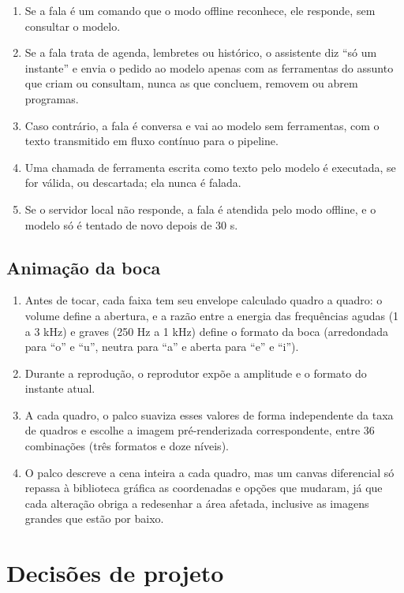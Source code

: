 \begin{enumerate}[label=\arabic*.]
  \item Se a fala é um comando que o modo offline reconhece, ele responde, sem consultar o modelo.
  \item Se a fala trata de agenda, lembretes ou histórico, o assistente diz “só um instante” e envia o
        pedido ao modelo apenas com as ferramentas do assunto que criam ou consultam, nunca as que
        concluem, removem ou abrem programas.
  \item Caso contrário, a fala é conversa e vai ao modelo sem ferramentas, com o texto transmitido em
        fluxo contínuo para o pipeline.
  \item Uma chamada de ferramenta escrita como texto pelo modelo é executada, se for válida, ou
        descartada; ela nunca é falada.
  \item Se o servidor local não responde, a fala é atendida pelo modo offline, e o modelo só é tentado
        de novo depois de 30 s.
\end{enumerate}

\subsection{Animação da boca}

\begin{enumerate}[label=\arabic*.]
  \item Antes de tocar, cada faixa tem seu envelope calculado quadro a quadro: o volume define a
        abertura, e a razão entre a energia das frequências agudas (1 a 3 kHz) e graves (250 Hz a
        1 kHz) define o formato da boca (arredondada para “o” e “u”, neutra para “a” e aberta para “e” e “i”).
  \item Durante a reprodução, o reprodutor expõe a amplitude e o formato do instante atual.
  \item A cada quadro, o palco suaviza esses valores de forma independente da taxa de quadros e escolhe a
        imagem pré-renderizada correspondente, entre 36 combinações (três formatos e doze níveis).
  \item O palco descreve a cena inteira a cada quadro, mas um canvas diferencial só repassa à biblioteca
        gráfica as coordenadas e opções que mudaram, já que cada alteração obriga a redesenhar a área
        afetada, inclusive as imagens grandes que estão por baixo.
\end{enumerate}

\section{Decisões de projeto}

